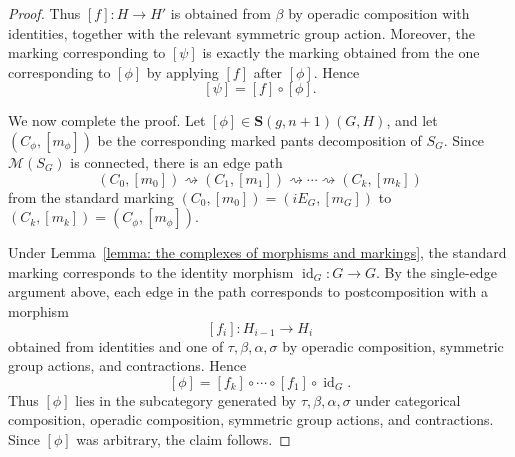 \documentclass{amsart}
\newcommand{\bS}{\mathbf{S}}
\newcommand{\calM}{\mathcal{M}}
\newcommand{\id}{\operatorname{id}}
\newcommand{\Hom}{\operatorname{Hom}}
\theoremstyle{definition}
\numberwithin{equation}{section}
\begin{document}
\begin{proof}
Thus $[f]:H\to H'$ is obtained from $\beta$ by operadic composition with identities, together with the relevant symmetric group action. Moreover, the marking corresponding to $[\psi]$ is exactly the marking obtained from the one corresponding to $[\phi]$ by applying $[f]$ after $[\phi]$. Hence
\[
[\psi]=[f]\circ[\phi].
\]


We now complete the proof. Let $[\phi]\in \bS(g,n+1)(G,H)$, and let $(C_\phi,[m_\phi])$ be the corresponding marked pants decomposition of $S_G$. Since $\calM(S_G)$ is connected, there is an edge path
\[
(C_0,[m_0])\rightsquigarrow (C_1,[m_1])
\rightsquigarrow \cdots \rightsquigarrow (C_k,[m_k])
\]
from the standard marking $(C_0,[m_0])=(iE_G,[m_G])$ to $(C_k,[m_k])=(C_\phi,[m_\phi])$.

Under Lemma~\ref{lemma: the complexes of morphisms and markings}, the standard marking corresponds to the identity morphism $\id_G:G\to G$. By the single-edge argument above, each edge in the path corresponds to postcomposition with a morphism
\[
[f_i]:H_{i-1}\to H_i
\]
obtained from identities and one of $\tau,\beta,\alpha,\sigma$ by operadic composition, symmetric group actions, and contractions. Hence
\[
[\phi]=[f_k]\circ\cdots\circ [f_1]\circ \id_G.
\]
Thus $[\phi]$ lies in the subcategory generated by $\tau,\beta,\alpha,\sigma$ under categorical composition, operadic composition, symmetric group actions, and contractions. Since $[\phi]$ was arbitrary, the claim follows.
\end{proof}

\end{document}
